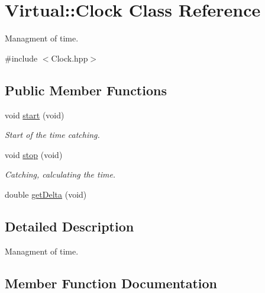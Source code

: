 \hypertarget{class_virtual_1_1_clock}{}\section{Virtual\+:\+:Clock Class Reference}
\label{class_virtual_1_1_clock}


Managment of time.  




{\ttfamily \#include $<$Clock.\+hpp$>$}

\subsection*{Public Member Functions}
\begin{DoxyCompactItemize}
\item 
\hypertarget{class_virtual_1_1_clock_afadf22f33ce39602ec633dea45ea5071}{}\label{class_virtual_1_1_clock_afadf22f33ce39602ec633dea45ea5071} 
void \hyperlink{class_virtual_1_1_clock_afadf22f33ce39602ec633dea45ea5071}{start} (void)
\begin{DoxyCompactList}\small\item\em Start of the time catching. \end{DoxyCompactList}\item 
\hypertarget{class_virtual_1_1_clock_a7a32ac32a06ef34178d985b0a6c08c57}{}\label{class_virtual_1_1_clock_a7a32ac32a06ef34178d985b0a6c08c57} 
void \hyperlink{class_virtual_1_1_clock_a7a32ac32a06ef34178d985b0a6c08c57}{stop} (void)
\begin{DoxyCompactList}\small\item\em Catching, calculating the time. \end{DoxyCompactList}\item 
double \hyperlink{class_virtual_1_1_clock_a93eb30323793a30b8fd0afee4389d471}{get\+Delta} (void)
\end{DoxyCompactItemize}


\subsection{Detailed Description}
Managment of time. 

\subsection{Member Function Documentation}
\hypertarget{class_virtual_1_1_clock_a93eb30323793a30b8fd0afee4389d471}{}\label{class_virtual_1_1_clock_a93eb30323793a30b8fd0afee4389d471} 
